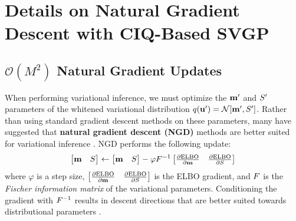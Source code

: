 \chapter{Details on Natural Gradient Descent with CIQ-Based SVGP}
\label{app:ngd}

\section{$\mathcal{O}(M^2)$ Natural Gradient Updates}
\label{app:ngd}

When performing variational inference, we must optimize the $\mathbf{m}'$ and $S'$ parameters of the whitened variational distribution $q(\bu') = \normaldist{\bmm'}{\bS'}$.
Rather than using standard gradient descent methods on these parameters, many have suggested that {\bf natural gradient descent (NGD)} methods are better suited for variational inference \cite{hoffman2013stochastic,hensman2012fast,salimbeni2018natural}.
NGD performs the following update:
%
\begin{equation}
  \begin{bmatrix} \mathbf{m} & S \end{bmatrix} \gets \begin{bmatrix} \mathbf{m} & S \end{bmatrix} - \varphi  F^{-1}
  \begin{bmatrix} \frac{\partial \text{ELBO}}{\partial \mathbf{m}} & \frac{\partial \text{ELBO}}{\partial S} \end{bmatrix}
\end{equation}
%
where $\varphi$ is a step size, $\begin{bmatrix} \frac{\partial \text{ELBO}}{\partial \mathbf{m}} & \frac{\partial \text{ELBO}}{\partial S} \end{bmatrix}$ is the ELBO gradient, and $F$ is the \emph{Fischer information matrix} of the variational parameters.
Conditioning the gradient with $F^{-1}$ results in descent directions that are better suited towards distributional parameters \cite{hoffman2013stochastic}.

